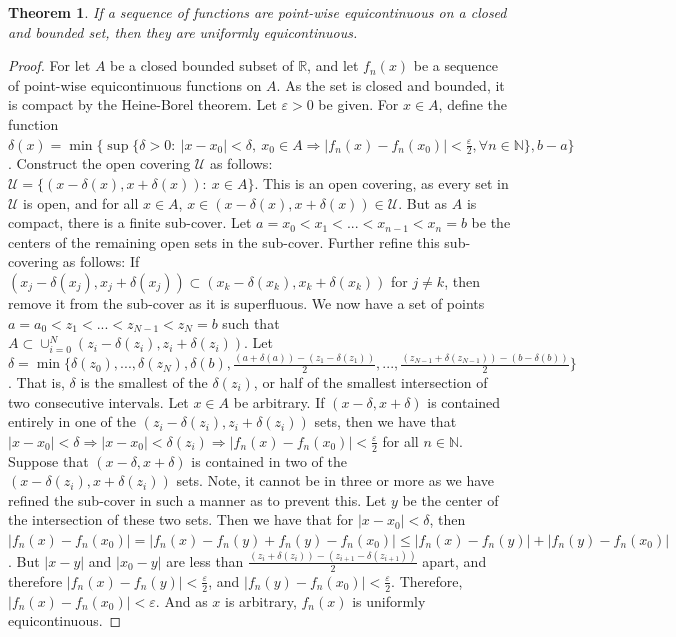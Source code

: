 \documentclass[12pt,oneside]{book}
\theoremstyle{mystyle}
\newtheorem{theorem}{Theorem}[section]
\begin{document}
\begin{theorem}
If a sequence of functions are point-wise equicontinuous on a closed and bounded set, then they are uniformly equicontinuous.
\end{theorem}
\begin{proof}
For let $A$ be a closed bounded subset of $\mathbb{R}$, and let $f_n(x)$ be a sequence of point-wise equicontinuous functions on $A$. As the set is closed and bounded, it is compact by the Heine-Borel theorem. Let $\varepsilon>0$ be given. For $x\in A$, define the function $\delta(x) = \min\{\sup\{\delta>0:\ |x-x_0|<\delta,\ x_0\in A \Rightarrow |f_n(x)-f_n(x_0)|<\frac{\varepsilon}{2}, \forall n\in\mathbb{N}\},b-a\}$. Construct the open covering $\mathcal{U}$ as follows: $\mathcal{U} = \{(x-\delta(x),x+\delta(x)):\ x\in A\}$. This is an open covering, as every set in $\mathcal{U}$ is open, and for all $x\in A$, $x\in(x-\delta(x),x+\delta(x))\in\mathcal{U}$. But as $A$ is compact, there is a finite sub-cover. Let $a=x_0<x_1<...<x_{n-1}<x_n=b$ be the centers of the remaining open sets in the sub-cover. Further refine this sub-covering as follows: If $(x_j-\delta(x_j),x_j+\delta(x_j))\subset (x_k-\delta(x_k),x_k+\delta(x_k))$ for $j\ne k$, then remove it from the sub-cover as it is superfluous. We now have a set of points $a=a_0<z_1<...<z_{N-1}<z_N=b$ such that $A \subset \cup_{i=0}^{N} (z_i-\delta(z_i),z_i+\delta(z_i))$. Let $\delta = \min\{\delta(z_0),...,\delta(z_N),\delta(b), \frac{(a+\delta(a)) - (z_1-\delta(z_1))}{2}, ..., \frac{(z_{N-1} + \delta(z_{N-1})) - (b-\delta(b))}{2}\}$. That is, $\delta$ is the smallest of the $\delta(z_i)$, or half of the smallest intersection of two consecutive intervals. Let $x\in A$ be arbitrary. If $(x-\delta,x+\delta)$ is contained entirely in one of the $(z_i-\delta(z_i),z_i+\delta(z_i))$ sets, then we have that $|x-x_0|<\delta \Rightarrow |x-x_0| <\delta(z_i) \Rightarrow |f_n(x)-f_n(x_0)|<\frac{\varepsilon}{2}$ for all $n\in\mathbb{N}$. Suppose that $(x-\delta,x+\delta)$ is contained in two of the $(x-\delta(z_i),x+\delta(z_i))$ sets. Note, it cannot be in three or more as we have refined the sub-cover in such a manner as to prevent this. Let $y$ be the center of the intersection of these two sets. Then we have that for $|x-x_0|<\delta$, then $|f_n(x)-f_n(x_0)| = |f_n(x) - f_n(y) + f_n(y) - f_n(x_0)| \leq |f_n(x) - f_n(y)| + |f_n(y) - f_n(x_0)|$. But $|x-y|$ and $|x_0-y|$ are less than $\frac{(z_i + \delta(z_i))-(z_{i+1}-\delta(z_{i+1}))}{2}$ apart, and therefore $|f_n(x) - f_n(y)|<\frac{\varepsilon}{2}$, and $|f_n(y) - f_n(x_0)| < \frac{\varepsilon}{2}$. Therefore, $|f_n(x) - f_n(x_0)|<\varepsilon$. And as $x$ is arbitrary, $f_n(x)$ is uniformly equicontinuous.
\end{proof}
\end{document}
